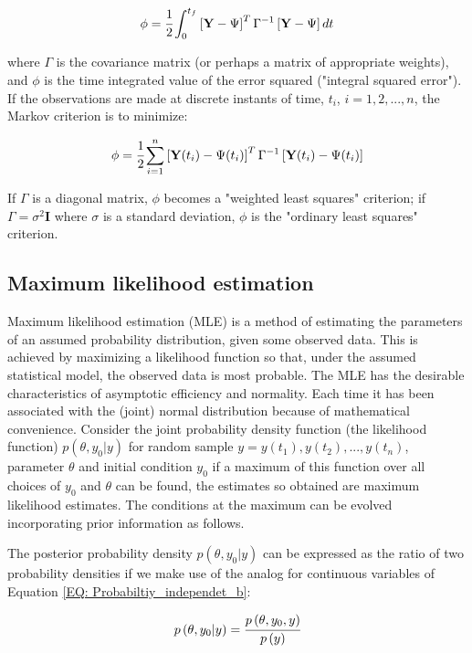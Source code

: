 \documentclass[a4paper,fleqn]{cas-dc}
\begin{document}
\begin{equation}
	\phi =  \cfrac{1}{2} \int_{0}^{t_f}  \left[ \textbf{Y} - \Psi \right]^T \Gamma^{-1} \left[ \textbf{Y} - \Psi \right] dt
\end{equation}

where $\Gamma$ is the covariance matrix (or perhaps a matrix of appropriate weights), and $\phi$ is the time integrated value of the error squared ("integral squared error"). If the observations are made at discrete instants of time, $t_i$, $i = 1,2,...,n$, the Markov criterion is to minimize:

\begin{equation}
	\phi = \cfrac{1}{2} \sum_{i=1}^{n} \left[ \textbf{Y}(t_i) - \Psi(t_i) \right]^T \Gamma^{-1} \left[ \textbf{Y}(t_i) - \Psi(t_i) \right] 
\end{equation}

If $\Gamma$ is a diagonal matrix, $\phi$  becomes a "weighted least squares" criterion; if $\Gamma = \sigma^2 \textbf{I}$ where $\sigma$ is a standard deviation, $\phi$ is the "ordinary least squares" criterion.

\subsection{Maximum likelihood estimation}

Maximum likelihood estimation (MLE) is a method of estimating the parameters of an assumed probability distribution, given some observed data. This is achieved by maximizing a likelihood function so that, under the assumed statistical model, the observed data is most probable. The MLE has the desirable characteristics of asymptotic efficiency and normality. Each time it has been associated with the (joint) normal distribution because of mathematical convenience. Consider the joint probability density function (the likelihood function) $p(\theta, y_0|y)$ for random sample $y = y(t_1),y(t_2),...,y(t_n)$, parameter $\theta$ and initial condition $y_0$ if a maximum of this function over all choices of $y_0$ and $\theta$ can be found, the estimates so obtained are maximum likelihood estimates. The conditions at the maximum can be evolved incorporating prior information as follows.

The posterior probability density $p(\theta,y_0|y)$ can be expressed as the ratio of two probability densities if we make use of the analog for continuous variables of Equation \ref{EQ: Probabiltiy_independet_b}:

\begin{equation} \label{EQ: Posterior_distribution}
	p\left( \theta,y_0|y \right) = \cfrac{p\left( \theta, y_0, y \right)}{p\left( y \right)}
\end{equation}
\end{document}
